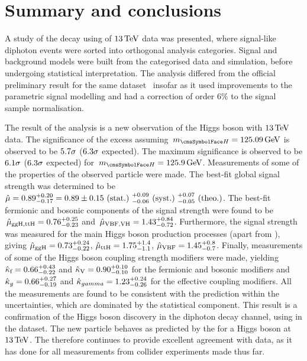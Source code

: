 \chapter{Summary and conclusions}
\label{chap:conclusions}

A study of the \Hgg decay using \thisanalysislumi\ifb of $13\,\text{Te\hspace{-.08em}V}$ data was presented, where signal-like diphoton events were sorted into orthogonal analysis categories.
Signal and background models were built from the categorised data and simulation, before undergoing statistical interpretation. The analysis differed from the official \CMS preliminary result for the same dataset~\cite{CMS-PAS-HIG-16-020} insofar as it used improvements to the parametric signal modelling and had a correction of order 6\% to the signal sample normalisation. %

The result of the analysis is a new observation of the Higgs boson with $13\,\text{Te\hspace{-.08em}V}$ data. The significance of the excess assuming $\mH=125.09\GeV$ is observed to be $5.7\sigma$ ($6.3\sigma$ expected). The maximum significance is observed to be $6.1\sigma$ ($6.3\sigma$ expected) for $\mH=\bestFitGlobalMH\GeV$.
Measurements of some of the properties of the observed particle were made. The best-fit global signal strength was determined to be $\hat{\mu} = 0.89^{+0.20}_{-0.17} = 0.89 \pm 0.15 \text{~(stat.)~} ^{+0.09}_{-0.06} \text{~(syst.)~} ^{+0.07}_{-0.05} \text{~(theo.)}$. The best-fit fermionic and bosonic components of the signal strength were found to be $\,\hat{\mu}_{\text{ggH},\text{ttH}} = 0.76^{+0.25}_{-0.23}$ and $\,\hat{\mu}_{\text{VBF},\text{VH}} = 1.43^{+0.84}_{-0.72}$. Furthermore, the signal strength was measured for the main Higgs boson production processes (apart from \VH), giving $\hat{\mu}_{\text{ggH}} = 0.73^{+0.24}_{-0.22}$, $\hat{\mu}_{\text{ttH}} = 1.75^{+1.4}_{-1.1}$, $\hat{\mu}_{\text{VBF}} = 1.45^{+0.8}_{-0.7}$. Finally, measurements of some of the Higgs boson coupling strength modifiers were made, yielding $\hat{\kappa}_{\text{f}} = 0.66^{+0.43}_{-0.22}$ and $\hat{\kappa}_{\text{V}} = 0.90^{+0.10}_{-0.10}$ for the fermionic and bosonic modifiers and $\hat{\kappa}_{g} = 0.66^{+0.27}_{-0.19}$ and $\hat{\kappa}_{gamma} = 1.23^{+0.24}_{-0.26}$ for the effective coupling modifiers.
All the measurements are found to be consistent with the \SM prediction within the uncertainties, which are dominated by the statistical component. 
This result is a confirmation of the Higgs boson discovery in the diphoton decay channel, using in the \RunII dataset. 
The new particle behaves as predicted by the \SM for a Higgs boson at $13\,\text{Te\hspace{-.08em}V}$. The \SM therefore continues to provide excellent agreement with data, as it has done for all measurements from collider experiments made thus far.
 
